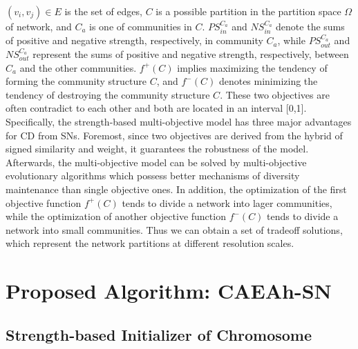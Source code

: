 \documentclass[10pt, journal]{IEEEtran}
\begin{document}
$(v_i,v_j) \in E$ is the set of edges, $C$ is a possible partition in the partition space $\Omega$ of network, and $C_a$ is one of communities in $C$.
$PS_{in}^{C_a}$ and $NS_{in}^{C_a}$ denote the sums of positive and negative strength, respectively, in community $C_a$, while $PS_{out}^{C_a}$ and $NS_{out}^{C_a}$ represent the sums of positive and negative strength, respectively, between $C_a$ and the other communities. $f^+(C)$ implies maximizing the tendency of forming the community structure $C$, and $f^-(C)$ denotes minimizing the tendency of destroying the community structure $C$. These two objectives are often contradict to each other and both are located in an interval [0,1].
Specifically, the strength-based multi-objective model has three major advantages for CD from SNs. 
Foremost, since two objectives are derived from the hybrid of signed similarity and weight, it guarantees the robustness of the model. 
Afterwards, the multi-objective model can be solved by multi-objective evolutionary algorithms which possess better mechanisms of diversity maintenance than single objective ones. In addition, the optimization of the first objective function $f^+(C)$ tends to divide a network into lager communities, while the optimization of another objective function $f^-(C)$ tends to divide a
network into small communities. Thus we can obtain a set of tradeoff solutions, which represent
the network partitions at different resolution scales.


\section{Proposed Algorithm: CAEA{\upshape h}-SN}\label{section:CAEAhSN}
\subsection{Strength-based Initializer of Chromosome}\label{section:CAEAqSN:chromosome}
\end{document}
